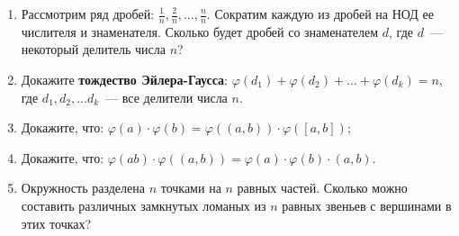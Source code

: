 \documentclass{article}
\begin{document}
\begin{enumerate}[label*=\protect\fbox{\arabic{enumi}}]
\item Рассмотрим ряд дробей: $\frac{1}{n}, \frac{2}{n}, \ldots, \frac{n}{n}$. Сократим каждую из дробей на НОД ее числителя и знаменателя. Сколько будет дробей со знаменателем $d$, где $d$~--- некоторый делитель числа $n$?

\item Докажите \textbf{тождество Эйлера-Гаусса}: $\varphi(d_1) + \varphi(d_2) + \ldots + \varphi(d_k) = n$, где $d_1, d_2, \ldots d_k$~--- все делители числа $n$.

\item Докажите, что:  $\varphi(a)\cdot \varphi(b)=\varphi((a,b))\cdot \varphi([a,b]);$
\item Докажите, что:  $\varphi(ab)\cdot \varphi((a,b)) =\varphi(a)\cdot \varphi(b)\cdot (a,b).$
\item Окружность разделена $n$ точками на $n$ равных частей. Сколько можно составить различных замкнутых ломаных из $n$ равных звеньев с вершинами в этих точках?

\end{enumerate}
\end{document}
